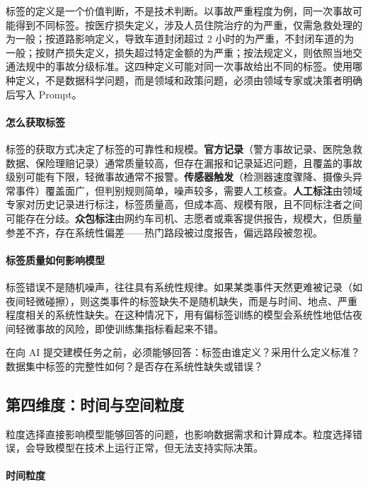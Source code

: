 标签的定义是一个价值判断，不是技术判断。以事故严重程度为例，同一次事故可能得到不同标签。按医疗损失定义，涉及人员住院治疗的为严重，仅需急救处理的为一般；按道路影响定义，导致车道封闭超过 2 小时的为严重，不封闭车道的为一般；按财产损失定义，损失超过特定金额的为严重；按法规定义，则依照当地交通法规中的事故分级标准。这四种定义可能对同一次事故给出不同的标签。使用哪种定义，不是数据科学问题，而是领域和政策问题，必须由领域专家或决策者明确后写入 Prompt。

\paragraph{怎么获取标签}

标签的获取方式决定了标签的可靠性和规模。\textbf{官方记录}（警方事故记录、医院急救数据、保险理赔记录）通常质量较高，但存在漏报和记录延迟问题，且覆盖的事故级别可能有下限，轻微事故通常不报警。\textbf{传感器触发}（检测器速度骤降、摄像头异常事件）覆盖面广，但判别规则简单，噪声较多，需要人工核查。\textbf{人工标注}由领域专家对历史记录进行标注，标签质量高，但成本高、规模有限，且不同标注者之间可能存在分歧。\textbf{众包标注}由网约车司机、志愿者或乘客提供报告，规模大，但质量参差不齐，存在系统性偏差——热门路段被过度报告，偏远路段被忽视。

\paragraph{标签质量如何影响模型}

标签错误不是随机噪声，往往具有系统性规律。如果某类事件天然更难被记录（如夜间轻微碰擦），则这类事件的标签缺失不是随机缺失，而是与时间、地点、严重程度相关的系统性缺失。在这种情况下，用有偏标签训练的模型会系统性地低估夜间轻微事故的风险，即使训练集指标看起来不错。

在向 AI 提交建模任务之前，必须能够回答：标签由谁定义？采用什么定义标准？数据集中标签的完整性如何？是否存在系统性缺失或错误？

\subsection{第四维度：时间与空间粒度}

粒度选择直接影响模型能够回答的问题，也影响数据需求和计算成本。粒度选择错误，会导致模型在技术上运行正常，但无法支持实际决策。

\paragraph{时间粒度}

